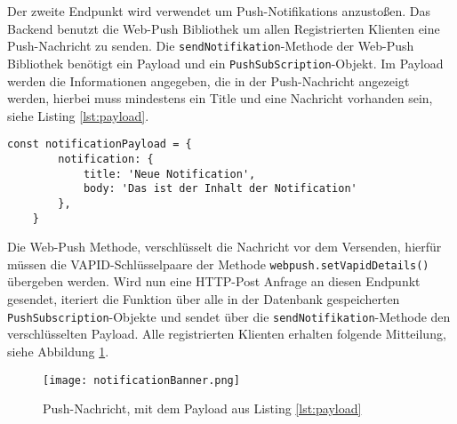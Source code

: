 Der zweite Endpunkt wird verwendet um Push-Notifikations anzustoßen. Das Backend benutzt die Web-Push Bibliothek um allen Registrierten Klienten eine Push-Nachricht zu senden.  Die \texttt{sendNotifikation}-Methode der Web-Push Bibliothek benötigt ein Payload und ein \texttt{PushSubScription}-Objekt. Im Payload werden die Informationen angegeben, die in der Push-Nachricht angezeigt werden, hierbei muss mindestens ein Title und eine Nachricht vorhanden sein, siehe Listing \ref{lst:payload}. 

\begin{lstlisting}[caption={Mindestanforderung an ein Payload, für eine Push-Nachricht}, label=lst:payload, float=!htb]
    const notificationPayload = {
        notification: {
            title: 'Neue Notification',
            body: 'Das ist der Inhalt der Notification'
        },
    }
\end{lstlisting}

Die Web-Push Methode, verschlüsselt die Nachricht vor dem Versenden, hierfür müssen die VAPID-Schlüsselpaare der Methode \texttt{webpush.setVapidDetails()} übergeben werden. 
Wird nun eine HTTP-Post Anfrage an diesen Endpunkt gesendet, iteriert die Funktion über alle in der Datenbank gespeicherten \texttt{PushSubscription}-Objekte und sendet über die \texttt{sendNotifikation}-Methode den verschlüsselten Payload. Alle registrierten Klienten erhalten folgende Mitteilung, siehe Abbildung \ref{img:notificationBanner}.

\begin{figure}[!htb]
    \centering
    \texttt{[image: notificationBanner.png]}
    \caption{Push-Nachricht, mit dem Payload aus Listing \ref{lst:payload}}
    \label{img:notificationBanner}
\end{figure}